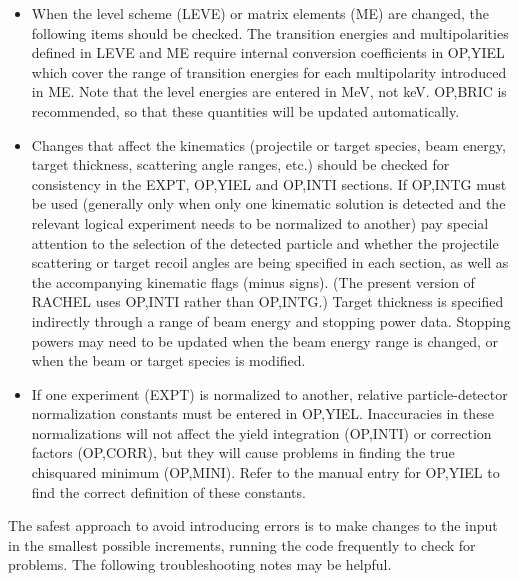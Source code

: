 \documentclass[10pt]{article}
\begin{document}
\begin{itemize}
  \item When the level scheme (LEVE) or matrix elements (ME) are changed, the following items should be checked. The transition energies and multipolarities defined in LEVE and ME require internal conversion coefficients in OP,YIEL which cover the range of transition energies for each multipolarity introduced in ME. Note that the level energies are entered in MeV, not keV. OP,BRIC is recommended, so that these quantities will be updated automatically.
  \item Changes that affect the kinematics (projectile or target species, beam energy, target thickness, scattering angle ranges, etc.) should be checked for consistency in the EXPT, OP,YIEL and OP,INTI sections. If OP,INTG must be used (generally only when only one kinematic solution is detected and the relevant logical experiment needs to be normalized to another) pay special attention to the selection of the detected particle and whether the projectile scattering or target recoil angles are being specified in each section, as well as the accompanying kinematic flags (minus signs). (The present version of RACHEL uses OP,INTI rather than OP,INTG.) Target thickness is specified indirectly through a range of beam energy and stopping power data. Stopping powers may need to be updated when the beam energy range is changed, or when the beam or target species is modified.
  \item If one experiment (EXPT) is normalized to another, relative particle-detector normalization constants must be entered in OP,YIEL. Inaccuracies in these normalizations will not affect the yield integration (OP,INTI) or correction factors (OP,CORR), but they will cause problems in finding the true chisquared minimum (OP,MINI). Refer to the manual entry for OP,YIEL to find the correct definition of these constants.
\end{itemize}

The safest approach to avoid introducing errors is to make changes to the input in the smallest possible increments, running the code frequently to check for problems. The following troubleshooting notes may be helpful.
\end{document}
